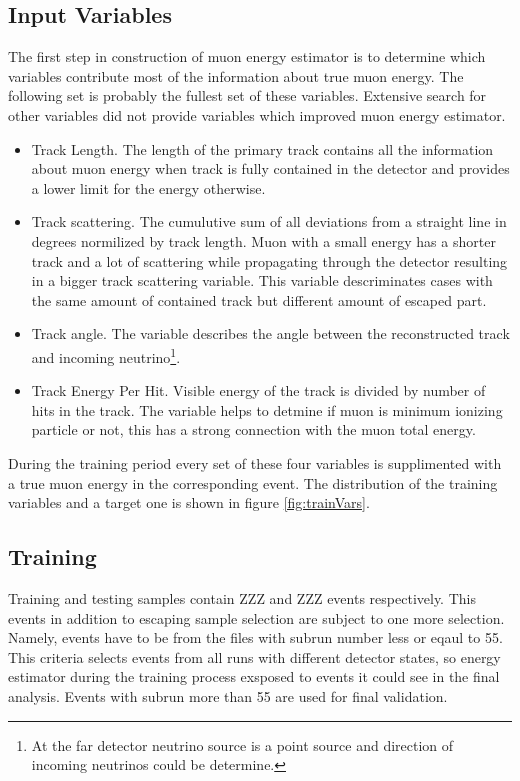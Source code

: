 \subsection{Input Variables}
The first step in construction of muon energy estimator is to determine which variables 
contribute most of the information about true muon energy. The following set is probably
the fullest set of these variables. Extensive search for other variables did not provide 
variables which improved muon energy estimator.
\begin{itemize}
\item Track Length. The length of the primary track contains all the information about muon
energy when track is fully contained in the detector and provides a lower limit for the 
energy otherwise.
\item Track scattering. The cumulutive sum of all deviations from a straight line in degrees
normilized by track length. Muon with a small energy has a shorter track and a lot of scattering 
while propagating through the detector resulting in a bigger track scattering variable. 
This variable descriminates cases with the same amount of contained track but different amount
of escaped part.
\item Track angle. The variable describes the angle between the reconstructed track and 
incoming neutrino\footnote{At the far detector neutrino source is a point source and direction
of incoming neutrinos could be determine.}. 
\item Track Energy Per Hit. Visible energy of the track is divided by number of hits in the 
track. The variable helps to detmine if muon is minimum ionizing particle or not, this has
a strong connection with the muon total energy.
\end{itemize}

During the training period every set of these four variables is supplimented with a true muon
energy in the corresponding event. The distribution of the training variables and a target 
one is shown in figure \ref{fig:trainVars}. 

\subsection{Training}
Training and testing samples contain ZZZ and ZZZ events respectively. This events in addition
to escaping sample selection are subject to one more selection. Namely, events have to be
from the files with subrun number less or eqaul to 55. This criteria selects events from all
runs with different detector states, so energy estimator during the training process exsposed
to events it could see in the final analysis. Events with subrun more than 55 are used for 
final validation. 

